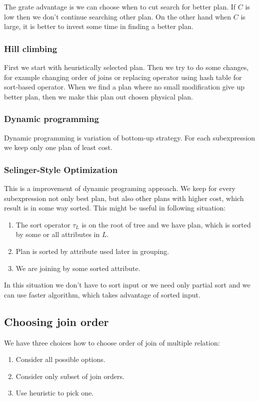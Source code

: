 The grate advantage is we can choose when to cut search for better plan. If $C$ is low then we don't continue searching other plan. On the other hand when $C$ is large, it is better to invest some time in finding a  better plan.
\subsubsection{Hill climbing}

First we start with heuristically selected plan. Then we try to do some changes, for example changing order of joins or replacing operator using hash table for sort-based operator. When we find a plan where no small modification give up better plan, then we make this plan out chosen physical plan.

\subsubsection{Dynamic programming}
Dynamic programming is variation of bottom-up strategy. For each subexpression we keep only one plan of least cost.

\subsubsection{Selinger-Style Optimization}
This is a improvement of dynamic programing approach. We keep for every subexpression not only best plan, but also other plans with higher cost, which result is in some way sorted. This might be useful in following situation:
\begin{enumerate}
\item The sort operator $\tau_L$ is on the root of tree and we have plan, which is sorted by some or all attributes in $L$.
\item Plan is sorted by attribute used later in grouping.
\item We are joining by some sorted attribute.
\end{enumerate}
In this situation we don't have to sort input or we need only partial sort and we can use faster algorithm, which takes advantage of sorted input.


\subsection{Choosing join order}
\label{joinOrder}
 We have three choices how to choose order of join of multiple relation:
\begin{enumerate}
\item Consider all possible options.
\item Consider only subset of join orders.
\item Use heuristic to pick one.
\end{enumerate}
 
